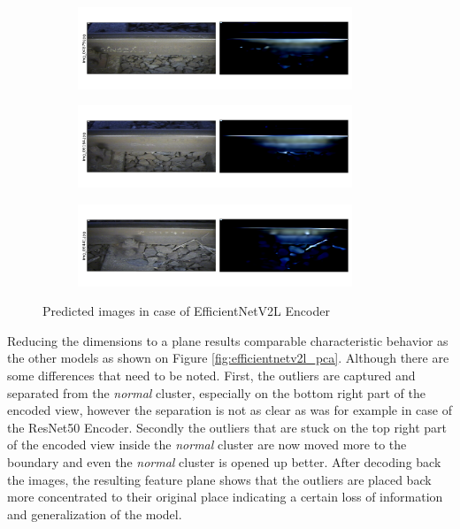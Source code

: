 \begin{figure}[!ht]
    \centering
    \begin{subfigure}{\textwidth}
        \centering
        \includegraphics[width=0.9\textwidth,trim={0 1cm 0 1cm},clip]{./results/efficientnetv2l_vgg19/20230525_194238_predict_0.png}
    \end{subfigure}
    \begin{subfigure}{\textwidth}
        \centering
        \includegraphics[width=0.9\textwidth,trim={0 1cm 0 1cm},clip]{./results/efficientnetv2l_vgg19/20230525_194238_predict_1.png}
    \end{subfigure}
    \begin{subfigure}{\textwidth}
        \centering
        \includegraphics[width=0.9\textwidth,trim={0 1cm 0 1cm},clip]{./results/efficientnetv2l_vgg19/20230525_194238_predict_2.png}
    \end{subfigure}
    \caption{Predicted images in case of EfficientNetV2L Encoder}
    \label{fig:efficientnetv2l_examples}
\end{figure}

Reducing the dimensions to a plane results comparable characteristic behavior as the other models
as shown on Figure \ref{fig:efficientnetv2l_pca}.
Although there are some differences that need to be noted.
First, the outliers are captured and separated from the \emph{normal} cluster, especially on the
bottom right part of the encoded view, however the separation is not as clear as was for example
in case of the ResNet50 Encoder.
Secondly the outliers that are stuck on the top right part of the encoded view inside the \emph{normal}
cluster are now moved more to the boundary and even the \emph{normal} cluster is opened up better.
After decoding back the images, the resulting feature plane shows that the outliers are placed back
more concentrated to their original place indicating a certain loss of information
and generalization of the model.

